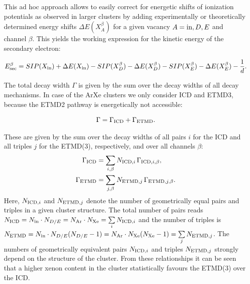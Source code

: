 This {\latin ad hoc} approach allows to easily correct for energetic shifts of ionization potentials as observed in larger clusters by adding experimentally or theoretically determined energy shifts $\Delta E(X_{A}^{\beta})$ for a given vacancy $A={\rm in},D,E$ and channel $\beta$. This yields the working expression for the kinetic energy of the secondary electron:

\begin{equation}
 E_{\rm sec}^\beta = SIP(X_{\rm in}) + \Delta E (X_{\rm in})
               - SIP(X_{D}^\beta) - \Delta E (X_{D}^\beta)
               - SIP(X_{E}^\beta) - \Delta E (X_{E}^\beta)
               - \frac 1d .
\end{equation}

The total decay width $\Gamma$ is given by the sum over the decay widths
of all decay mechanisms. In case of the ArXe clusters we only consider
ICD and ETMD3, because the ETMD2 pathway is energetically not accessible:

\begin{equation}
 \Gamma = \Gamma_{\rm ICD} + \Gamma_{\rm ETMD} .
\end{equation}

These are given by the sum over the decay widths of all pairs $i$ for the
ICD and all triples $j$ for the ETMD(3), respectively, and over all channels $\beta$:
%
\begin{align}
 \Gamma_{\rm ICD}  &= \sum\limits_{i,\beta} N_{{\rm ICD},i}  \, \Gamma_{{\rm ICD},i,\beta},\\
 \Gamma_{\rm ETMD} &= \sum\limits_{j,\beta} N_{{\rm ETMD},j} \, \Gamma_{{\rm ETMD},j,\beta}.
\end{align}
Here, $N_{{\rm ICD},i}$ and $N_{{\rm ETMD},j}$ denote the number of geometrically
equal pairs and triples in a given cluster structure. The total number of pairs
reads
$N_{{\rm ICD}} = N_{\rm in} \cdot N_{D/E} = N_{\rm Ar} \cdot N_{\rm Xe}
 = \sum\limits_i N_{{\rm ICD},i}$ and the number of triples is
$N_{{\rm ETMD}} = N_{\rm in} \cdot N_{D/E} (N_{D/E} - 1) = N_{\rm Ar} \cdot N_{\rm Xe} (N_{\rm Xe} - 1)
 = \sum\limits_j N_{{\rm ETMD},j}$.
The numbers of geometrically equivalent pairs $N_{{\rm ICD},i}$ and triples $N_{{\rm ETMD},j}$
strongly depend on the structure of the cluster. From these relationships
it can be seen that a higher xenon content in the cluster statistically
favours the ETMD(3) over the ICD.

